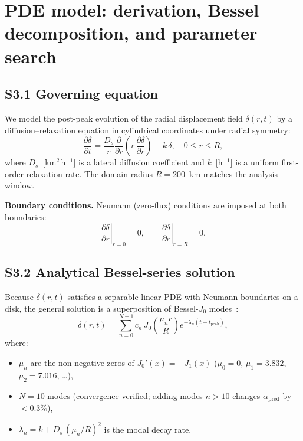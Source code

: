 \documentclass[11pt]{article}
\newcommand{\apred}{\alpha_{\mathrm{pred}}}
\newcommand{\Ds}{D_s}
\begin{document}
\section{PDE model: derivation, Bessel decomposition, and parameter
search}
\label{sec:si_pde}

\subsection*{S3.1 Governing equation}

We model the post-peak evolution of the radial displacement field
$\delta(r,t)$ by a diffusion--relaxation equation in cylindrical
coordinates under radial symmetry:
\begin{equation}
  \frac{\partial\delta}{\partial t}
    = \frac{\Ds}{r}\frac{\partial}{\partial r}
      \!\left(r\,\frac{\partial\delta}{\partial r}\right)
    - k\,\delta, \quad 0 \leq r \leq R,
  \label{si:eq:pde}
\end{equation}
where $\Ds$~[km$^2$\,h$^{-1}$] is a lateral diffusion coefficient
and $k$~[h$^{-1}$] is a uniform first-order relaxation rate.  The
domain radius $R = 200$~km matches the analysis window.

\noindent\textbf{Boundary conditions.}
Neumann (zero-flux) conditions are imposed at both boundaries:
\[
  \left.\frac{\partial\delta}{\partial r}\right|_{r=0} = 0, \qquad
  \left.\frac{\partial\delta}{\partial r}\right|_{r=R} = 0 .
\]

\subsection*{S3.2 Analytical Bessel-series solution}

Because $\delta(r,t)$ satisfies a separable linear PDE with Neumann
boundaries on a disk, the general solution is a superposition of
Bessel-$J_0$ modes~\citep{Crank1975}:
\begin{equation}
  \delta(r,t) = \sum_{n=0}^{N-1} c_n\,J_0\!\left(\frac{\mu_n r}{R}\right)
    e^{-\lambda_n (t-t_{\mathrm{peak}})},
  \label{si:eq:bessel}
\end{equation}
where:
\begin{itemize}
  \item $\mu_n$ are the non-negative zeros of $J_0'(x) = -J_1(x)$
        ($\mu_0 = 0$, $\mu_1 = 3.832$, $\mu_2 = 7.016$, \ldots),
  \item $N = 10$ modes (convergence verified; adding modes
        $n > 10$ changes $\apred$ by $< 0.3\%$),
  \item $\lambda_n = k + \Ds\,(\mu_n/R)^2$ is the modal decay rate.
\end{itemize}
\end{document}
